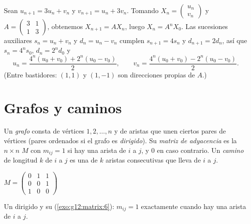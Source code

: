 \begin{example}\label{ex:g12:matrix:coupled}
Sean $u_{n+1} = 3u_n + v_n$ y $v_{n+1} = u_n + 3v_n$. Tomando
$X_n = \begin{pmatrix} u_n\\ v_n \end{pmatrix}$ y
$A = \begin{pmatrix} 3 & 1\\ 1 & 3\end{pmatrix}$, obtenemos
$X_{n+1} = AX_n$, luego $X_n = A^n X_0$. Las sucesiones auxiliares
$s_n = u_n + v_n$ y $d_n = u_n - v_n$ cumplen $s_{n+1} = 4s_n$ y
$d_{n+1} = 2d_n$, así que $s_n = 4^n s_0$, $d_n = 2^n d_0$ y
\[
u_n = \frac{4^n(u_0+v_0) + 2^n(u_0-v_0)}{2}, \qquad
v_n = \frac{4^n(u_0+v_0) - 2^n(u_0-v_0)}{2}.
\]
(Entre bastidores: $(1,1)$ y $(1,-1)$ son direcciones propias de $A$.)
\end{example}

\section{Grafos y caminos}

\begin{definition}\label{def:g12:matrix:graph}
Un \emph{grafo} consta de vértices $1, 2, \dots, n$ y de
aristas que unen ciertos pares de vértices (pares ordenados si el grafo es
\emph{dirigido}). Su \emph{matriz de adyacencia} es la  $n \times n$ $M$ con $m_{ij} = 1$ si hay una
arista de $i$ a $j$, y $0$ en caso contrario. Un \emph{camino} de longitud
$k$ de $i$ a $j$ es una  de $k$ aristas consecutivas que lleva de
$i$ a $j$.
\end{definition}

\begin{omfigure}
\qquad\qquad
$M = \begin{pmatrix} 0 & 1 & 1\\ 0 & 0 & 1\\ 1 & 0 & 0 \end{pmatrix}$

{\small Un  dirigido y su 
(\cref{exo:g12:matrix:6}): $m_{ij} = 1$ exactamente cuando hay una arista
de $i$ a $j$.}
\end{omfigure}

